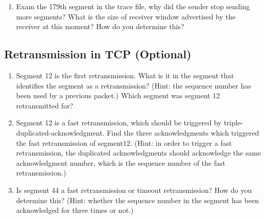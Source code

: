 \begin{enumerate}
\item Exam the 179th segment in the trace file, why did the sender
  stop sending more segments? What is the size of receiver window
  advertised by the receiver at this moment? How do you determine
  this?
\end{enumerate}

\subsection{Retransmission in TCP (Optional)}\label{sec:3.4.3}

\begin{enumerate}
\item Segment 12 is the first retransmission. What is it in the
  segment that identifies the segment as a retransmission? (Hint: the
  sequence number has been used by a previous packet.) Which segment
  was segment 12 retransmitted for?

\item Segment 12 is a fast retransmission, which should be triggered
  by triple-duplicated-acknowledgment. Find the three acknowledgments
  which triggered the fast retransmission of segment12. (Hint: in
  order to trigger a fast retransmission, the duplicated
  acknowledgments should acknowledge the same acknowledgment number,
  which is the sequence number of the fast retransmission.)

\item Is segment 44 a fast retransmission or timeout retransmission?
  How do you determine this? (Hint: whether the sequence number in the
  segment has been acknowledged for three times or not.)

\end{enumerate}